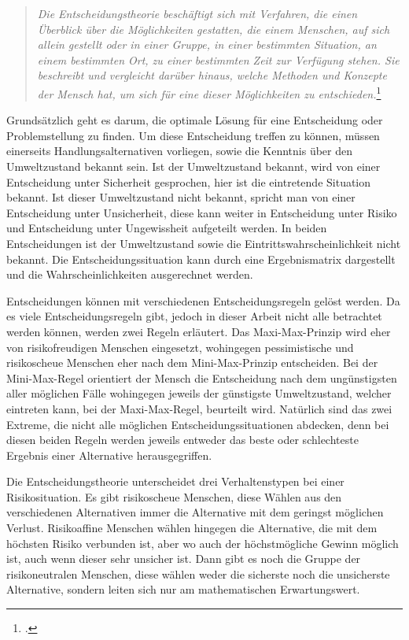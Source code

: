 \begin{quote}
	\textit{\glqq Die Entscheidungstheorie beschäftigt sich mit Verfahren, die einen Überblick über die Möglichkeiten gestatten, die einem Menschen, auf sich allein gestellt oder in einer Gruppe, in einer bestimmten Situation, an einem bestimmten Ort, zu einer bestimmten Zeit zur Verfügung stehen. Sie beschreibt und vergleicht darüber hinaus, welche Methoden und Konzepte der Mensch hat, um sich für eine dieser Möglichkeiten zu entschieden.\grqq}\footcite[S. 1]{wessler}
\end{quote}

Grundsätzlich geht es darum, die optimale Lösung für eine Entscheidung oder Problemstellung zu finden. Um diese Entscheidung treffen zu können, müssen einerseits Handlungsalternativen vorliegen, sowie die Kenntnis über den Umweltzustand bekannt sein. Ist der Umweltzustand bekannt, wird von einer Entscheidung unter Sicherheit gesprochen, hier ist die eintretende Situation bekannt. Ist dieser Umweltzustand nicht bekannt, spricht man von einer Entscheidung unter Unsicherheit, diese kann weiter in Entscheidung unter Risiko und Entscheidung unter Ungewissheit aufgeteilt werden. In beiden Entscheidungen ist der Umweltzustand sowie die Eintrittswahrscheinlichkeit nicht bekannt. Die Entscheidungssituation kann durch eine Ergebnismatrix dargestellt und die Wahrscheinlichkeiten ausgerechnet werden.

Entscheidungen können mit verschiedenen Entscheidungsregeln gelöst werden. Da es viele Entscheidungsregeln gibt, jedoch in dieser Arbeit nicht alle betrachtet werden können, werden zwei Regeln erläutert. Das Maxi-Max-Prinzip wird eher von risikofreudigen Menschen eingesetzt, wohingegen pessimistische und risikoscheue Menschen eher nach dem Mini-Max-Prinzip entscheiden. Bei der Mini-Max-Regel orientiert der Mensch die Entscheidung nach dem ungünstigsten aller möglichen Fälle wohingegen jeweils der günstigste Umweltzustand, welcher eintreten kann, bei der Maxi-Max-Regel, beurteilt wird.
Natürlich sind das zwei Extreme, die nicht alle möglichen Entscheidungssituationen abdecken, denn bei diesen beiden Regeln werden jeweils entweder das beste oder schlechteste Ergebnis einer Alternative herausgegriffen.

Die Entscheidungstheorie unterscheidet drei Verhaltenstypen bei einer Risikosituation. Es gibt risikoscheue Menschen, diese Wählen aus den verschiedenen Alternativen immer die Alternative mit dem geringst möglichen  Verlust. Risikoaffine Menschen wählen hingegen die Alternative, die mit dem höchsten Risiko verbunden ist, aber wo auch der höchstmögliche Gewinn möglich ist, auch wenn dieser sehr unsicher ist. Dann gibt es noch die Gruppe der risikoneutralen Menschen, diese wählen weder die sicherste noch die unsicherste Alternative, sondern leiten sich nur am mathematischen Erwartungswert.

